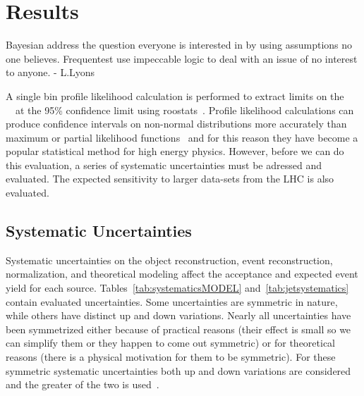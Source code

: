 \chapter{Results}
\label{SECTION-RESULTS}

Bayesian address the question everyone is interested in by using assumptions no one believes. Frequentest use impeccable logic to deal with an issue of no interest to anyone. - L.Lyons

\vspace{5mm} %

A single bin profile likelihood calculation is performed to extract limits on the \tz~\xs~at the 95\% confidence limit using roostats~\cite{ROOSTAT}. Profile likelihood calculations can produce confidence intervals on non-normal distributions more accurately than maximum or partial likelihood functions~\cite{st0132} and for this reason they have become a popular statistical method for high energy physics. However, before we can do this evaluation, a series of systematic uncertainties must be adressed and evaluated. The expected sensitivity to larger data-sets from the LHC is also evaluated. 

\section{Systematic Uncertainties}
\label{SECTION-systematics}

Systematic uncertainties on the object reconstruction, event reconstruction, normalization, and theoretical modeling affect the acceptance and expected event yield for each source. Tables~\ref{tab:systematicsMODEL} and~\ref{tab:jetsystematics} contain evaluated uncertainties. Some uncertainties are symmetric in nature, while others have distinct up and down variations. Nearly all uncertainties have been symmetrized either because of practical reasons (their effect is small so we can simplify them or they happen to come out symmetric) or for theoretical reasons (there is a physical motivation for them to be symmetric). For these symmetric systematic uncertainties both up and down variations are considered and the greater of the two is used~\cite{TOPCOMMONSYSTEMATICS}. 

